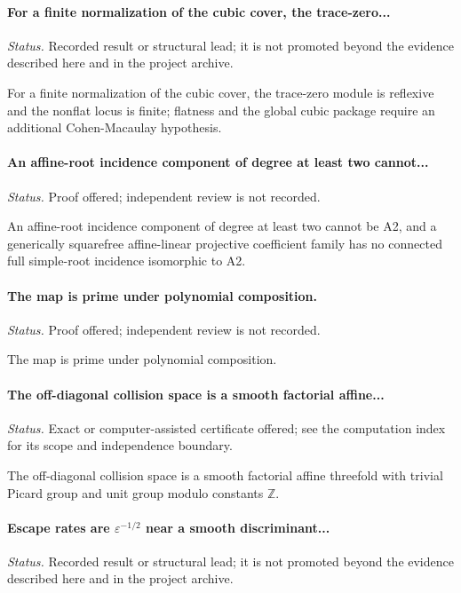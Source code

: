 \paragraph{For a finite normalization of the cubic cover, the trace-zero...}
\emph{Status.} Recorded result or structural lead; it is not promoted beyond the evidence described here and in the project archive.

For a finite normalization of the cubic cover, the trace-zero module is reflexive and the nonflat locus is finite; flatness and the global cubic package require an additional Cohen-Macaulay hypothesis.

\label{supp-note-01-016}
\paragraph{An affine-root incidence component of degree at least two cannot...}
\emph{Status.} Proof offered; independent review is not recorded.

An affine-root incidence component of degree at least two cannot be A2, and a generically squarefree affine-linear projective coefficient family has no connected full simple-root incidence isomorphic to A2.

\label{supp-note-01-017}
\paragraph{The map is prime under polynomial composition.}
\emph{Status.} Proof offered; independent review is not recorded.

The map is prime under polynomial composition.

\label{supp-note-01-018}
\paragraph{The off-diagonal collision space is a smooth factorial affine...}
\emph{Status.} Exact or computer-assisted certificate offered; see the computation index for its scope and independence boundary.

The off-diagonal collision space is a smooth factorial affine threefold with trivial Picard group and unit group modulo constants \(\mathbb Z\).

\label{supp-note-01-019}
\paragraph{Escape rates are \(\varepsilon^{-1/2}\) near a smooth discriminant...}
\emph{Status.} Recorded result or structural lead; it is not promoted beyond the evidence described here and in the project archive.

